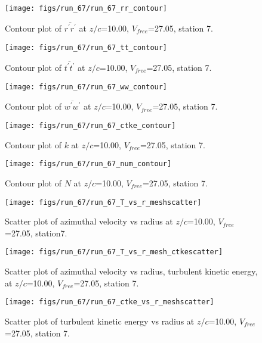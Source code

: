 \begin{figure}[H]
\centering
\texttt{[image: figs/run\_67/run\_67\_rr\_contour]}
\caption{Contour plot of $\overline{r^\prime r^\prime}$ at $z/c$=10.00, $V_{free}$=27.05, station 7.}
\label{fig:run_67_rr_contour}
\end{figure}


\begin{figure}[H]
\centering
\texttt{[image: figs/run\_67/run\_67\_tt\_contour]}
\caption{Contour plot of $\overline{t^\prime t^\prime}$ at $z/c$=10.00, $V_{free}$=27.05, station 7.}
\label{fig:run_67_tt_contour}
\end{figure}


\begin{figure}[H]
\centering
\texttt{[image: figs/run\_67/run\_67\_ww\_contour]}
\caption{Contour plot of $\overline{w^\prime w^\prime}$ at $z/c$=10.00, $V_{free}$=27.05, station 7.}
\label{fig:run_67_ww_contour}
\end{figure}


\begin{figure}[H]
\centering
\texttt{[image: figs/run\_67/run\_67\_ctke\_contour]}
\caption{Contour plot of $k$ at $z/c$=10.00, $V_{free}$=27.05, station 7.}
\label{fig:run_67_ctke_contour}
\end{figure}


\begin{figure}[H]
\centering
\texttt{[image: figs/run\_67/run\_67\_num\_contour]}
\caption{Contour plot of $N$ at $z/c$=10.00, $V_{free}$=27.05, station 7.}
\label{fig:run_67_num_contour}
\end{figure}


\begin{figure}[H]
\centering
\texttt{[image: figs/run\_67/run\_67\_T\_vs\_r\_meshscatter]}
\caption{Scatter plot of azimuthal velocity vs radius at $z/c$=10.00, $V_{free}$=27.05, station7.}
\label{fig:run_67_T_vs_r_meshscatter}
\end{figure}


\begin{figure}[H]
\centering
\texttt{[image: figs/run\_67/run\_67\_T\_vs\_r\_mesh\_ctkescatter]}
\caption{Scatter plot of azimuthal velocity vs radius, turbulent kinetic energy, at $z/c$=10.00, $V_{free}$=27.05, station 7.}
\label{fig:run_67_T_vs_r_mesh_ctkescatter}
\end{figure}


\begin{figure}[H]
\centering
\texttt{[image: figs/run\_67/run\_67\_ctke\_vs\_r\_meshscatter]}
\caption{Scatter plot of turbulent kinetic energy vs radius at $z/c$=10.00, $V_{free}$=27.05, station 7.}
\label{fig:run_67_ctke_vs_r_meshscatter}
\end{figure}


